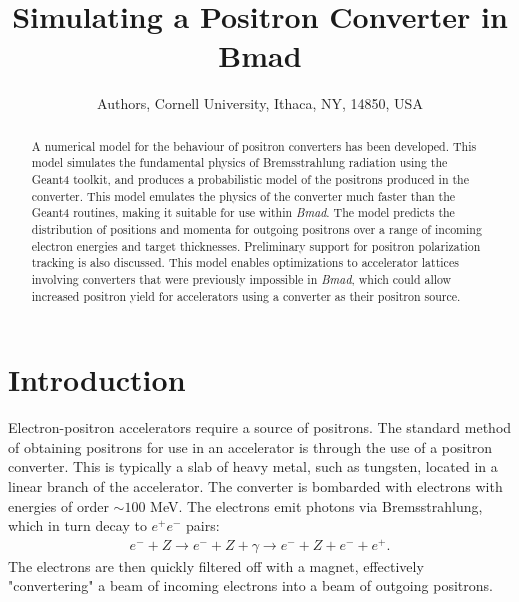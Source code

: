 \documentclass[letter,
               biblatex,     %
               keeplastbox,   %
               ]{jacow}
\newcommand{\bmad}{\textit{Bmad}}
\begin{document}
\title{Simulating a Positron Converter in Bmad}

\author{Authors, Cornell University, Ithaca, NY, 14850, USA}

\maketitle

\begin{abstract}
A numerical model for the behaviour of positron converters has been developed.
This model simulates the fundamental physics of Bremsstrahlung radiation using the Geant4 toolkit, and produces a probabilistic model of the positrons produced in the converter.
This model emulates the physics of the converter much faster than the Geant4 routines, making it suitable for use within \bmad.
The model predicts the distribution of positions and momenta for outgoing positrons over a range of incoming electron energies and target thicknesses.
Preliminary support for positron polarization tracking is also discussed.
This model enables optimizations to accelerator lattices involving converters that were previously impossible in \bmad, which could allow increased positron yield for accelerators using a converter as their positron source.
\end{abstract}

\section{Introduction}


Electron-positron accelerators require a source of positrons.
The standard method of obtaining positrons for use in an accelerator is through the use of a positron converter.
This is typically a slab of heavy metal, such as tungsten, located in a linear branch of the accelerator.
The converter is bombarded with electrons with energies of order $\sim 100$ MeV.
The electrons emit photons via Bremsstrahlung, which in turn decay to $e^+ e^-$ pairs:
\begin{align*}
e^- + Z \rightarrow e^- + Z + \gamma \rightarrow e^- + Z + e^- + e^+.
\end{align*}
The electrons are then quickly filtered off with a %
magnet, effectively "convertering" a beam of incoming electrons into a beam of outgoing positrons.
\end{document}
